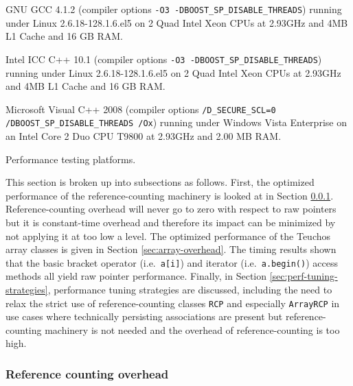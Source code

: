 \documentclass[pdf,ps2pdf,11pt]{SANDreport}
\begin{document}
\begin{table}
\begin{description}
%
{}\item[GCC 4.1.2:] GNU GCC 4.1.2 (compiler options {}\texttt{-O3
-DBOOST\_SP\_DISABLE\_THREADS}) running under Linux 2.6.18-128.1.6.el5
on 2 Quad Intel Xeon CPUs at 2.93GHz and 4MB L1 Cache and 16 GB RAM.
%
{}\item[ICC 10.1:] Intel ICC C++ 10.1 (compiler options {}\texttt{-O3
-DBOOST\_SP\_DISABLE\_THREADS}) running under Linux 2.6.18-128.1.6.el5
on 2 Quad Intel Xeon CPUs at 2.93GHz and 4MB L1 Cache and 16 GB RAM.
%
{}\item[MSVC++ 2008:] Microsoft Visual C++ 2008 (compiler options
{}\texttt{/D\_SECURE\_SCL=0 /DBOOST\_SP\_DISABLE\_THREADS /Ox})
running under Windows Vista Enterprise on an Intel Core 2 Duo CPU
T9800 at 2.93GHz and 2.00 MB RAM.
%
\end{description}
\caption{\label{tbl:PerfTestPlatforms}
Performance testing platforms.}
\end{table}

This section is broken up into subsections as follows.  First, the
optimized performance of the reference-counting machinery is looked at
in Section {}\ref{sec:reference-counting-overhead}.
Reference-counting overhead will never go to zero with respect to raw
pointers but it is constant-time overhead and therefore its impact can
be minimized by not applying it at too low a level.  The optimized
performance of the Teuchos array classes is given in Section
{}\ref{sec:array-overhead}.  The timing results shown that the basic
bracket operator (i.e.\ {}\texttt{a[i]}) and iterator (i.e.\
{}\texttt{a.begin()}) access methods all yield raw pointer
performance.  Finally, in Section {}\ref{sec:perf-tuning-strategies},
performance tuning strategies are discussed, including the need to
relax the strict use of reference-counting classes {}\texttt{RCP} and
especially {}\texttt{ArrayRCP} in use cases where technically
persisting associations are present but reference-counting machinery
is not needed and the overhead of reference-counting is too high.


%
{}\subsubsection{Reference counting overhead}
\label{sec:reference-counting-overhead}
%
\end{document}
